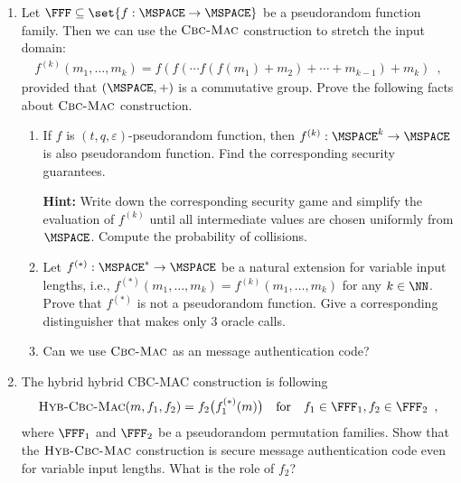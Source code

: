 \documentclass{article}
\begin{document}
\begin{enumerate}
\item Let $\FFF\subseteq\set{f:\MSPACE\to\MSPACE}$ be a pseudorandom
  function family. Then we can use the $\textsc{Cbc-Mac}$ construction
  to stretch the input domain:
  \begin{align*}
    f^{(k)}(m_1,\ldots,m_k)=f(f(\cdots f(f(m_1)+ m_2)+\cdots+m_{k-1})+m_k)\enspace,
  \end{align*}
  provided that $(\MSPACE,+)$ is a commutative group. Prove the
  following facts about $\textsc{Cbc-Mac}$ construction.
  \begin{enumerate}
  \item If $f$ is $(t,q,\varepsilon)$-pseudorandom function, then
    $f^{(k)}:\MSPACE^k\to\MSPACE$ is also pseudorandom function. Find
    the corresponding security guarantees.

    \textbf{Hint:} Write down the corresponding security game and
    simplify the evaluation of $f^{(k)}$ until all intermediate values
    are chosen uniformly from $\MSPACE$. Compute the probability of
    collisions.

  \item Let $f^{(*)}:\MSPACE^*\to\MSPACE$ be a natural extension for
    variable input lengths, i.e.,
    $f^{(*)}(m_1,\ldots,m_k)=f^{(k)}(m_1,\ldots,m_k)$ for any
    $k\in\NN$. Prove that $f^{(*)}$ is not a pseudorandom
    function. Give a corresponding distinguisher that makes only $3$
    oracle calls.

  \item Can we use $\textsc{Cbc-Mac}$ as an message authentication code?
  \end{enumerate}

  \item The hybrid hybrid CBC-MAC construction is following
  \begin{align*}
    \textsc{Hyb-Cbc-Mac}(m,f_1,f_2)=f_2\bigl(f_1^{(*)}(m)\bigr)\quad\text{for}\quad
    f_1\in\FFF_1, f_2\in\FFF_2\enspace,
  \end{align*}
  where $\FFF_1$ and $\FFF_2$ be a pseudorandom permutation
  families. Show that the $\textsc{Hyb-Cbc-Mac}$ construction is
  secure message authentication code even for variable input lengths.
  What is the role of $f_2$?



\end{enumerate}
\end{document}
